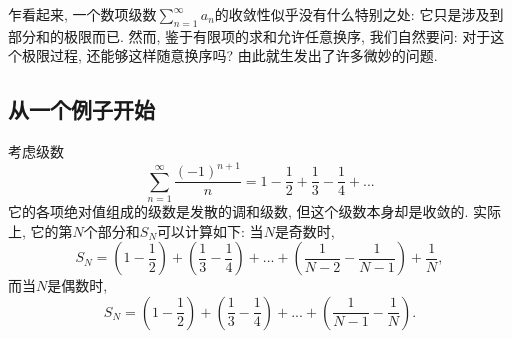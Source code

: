 

乍看起来, 一个数项级数$\sum_{n=1}^\infty a_n$的收敛性似乎没有什么特别之处: 它只是涉及到部分和的极限而已. 然而, 鉴于有限项的求和允许任意换序, 我们自然要问: 对于这个极限过程, 还能够这样随意换序吗? 由此就生发出了许多微妙的问题.

\subsection{从一个例子开始}

考虑级数
$$
\sum_{n=1}^\infty\frac{(-1)^{n+1}}{n}
=1-\frac{1}{2}+\frac{1}{3}-\frac{1}{4}+...
$$
它的各项绝对值组成的级数是发散的调和级数, 但这个级数本身却是收敛的. 实际上, 它的第$N$个部分和$S_N$可以计算如下: 当$N$是奇数时,
$$
S_N=\left(1-\frac{1}{2}\right)+\left(\frac{1}{3}-\frac{1}{4}\right)+...+\left(\frac{1}{N-2}-\frac{1}{N-1}\right)+\frac{1}{N},
$$
而当$N$是偶数时,
$$
S_N=\left(1-\frac{1}{2}\right)+\left(\frac{1}{3}-\frac{1}{4}\right)+...+\left(\frac{1}{N-1}-\frac{1}{N}\right).
$$
